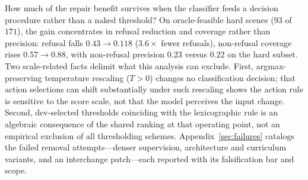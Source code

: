 How much of the repair benefit survives when the classifier feeds a
decision procedure rather than a naked threshold? On oracle-feasible
hard scenes ($93$ of $171$), the gain concentrates in refusal reduction
and coverage rather than precision:
refusal falls $0.43 \to 0.118$ ($3.6\times$ fewer refusals), non-refusal
coverage rises $0.57 \to 0.88$, with non-refusal precision $0.23$ versus
$0.22$ on the hard subset.
Two scale-related facts delimit what this analysis can exclude. First,
argmax-preserving temperature rescaling ($T>0$) changes no classification
decision; that action selections can shift substantially under such
rescaling shows the action rule is sensitive to the score scale, not that
the model perceives the input change. Second, dev-selected thresholds
coinciding with the lexicographic rule is an algebraic consequence of the
shared ranking at that operating point, not an empirical exclusion of all
thresholding schemes. Appendix~\ref{sec:failures} catalogs the failed
removal attempts---denser supervision, architecture and curriculum
variants, and an interchange patch---each reported with its falsification
bar and scope.
